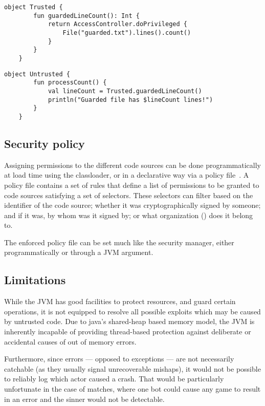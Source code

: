 	\begin{center}
		\begin{minipage}{12cm}
		\begin{lstlisting}[title={\code{Trusted.kt}}]
	object Trusted {
		fun guardedLineCount(): Int {
			return AccessController.doPrivileged {
				File("guarded.txt").lines().count()
			}
		}
	}
		\end{lstlisting}
	
		\begin{lstlisting}[title={\code{Untrusted.kt}}]
	object Untrusted {
		fun processCount() {
			val lineCount = Trusted.guardedLineCount()
			println("Guarded file has $lineCount lines!")
		}
	}
		\end{lstlisting}
		\end{minipage}
	\end{center}

	\subsection{Security policy}
	
	Assigning permissions to the different code sources can be done programmatically at load time using the classloader, or in a declarative way via a policy file~\cite{JavaPermissionsPolicy}. A policy file contains a set of rules that define a list of permissions to be granted to code sources satisfying a set of selectors. These selectors can filter based on the identifier of the code source; whether it was cryptographically signed by someone; and if it was, by whom was it signed by; or what organization () does it belong to.
	
	The enforced policy file can be set much like the security manager, either programmatically or through a JVM argument. 

	\subsection{Limitations}
	
	While the JVM has good facilities to protect resources, and guard certain operations, it is not equipped to resolve all possible exploits which may be caused by untrusted code. Due to java's shared-heap based memory model, the JVM is inherently incapable of providing thread-based protection against deliberate or accidental causes of out of memory errors.
	
	Furthermore, since errors --- opposed to exceptions --- are not necessarily catchable (as they usually signal unrecoverable mishaps), it would not be possible to reliably log which actor caused a crash. That would be particularly unfortunate in the case of matches, where one bot could cause any game to result in an error and the sinner would not be detectable.

